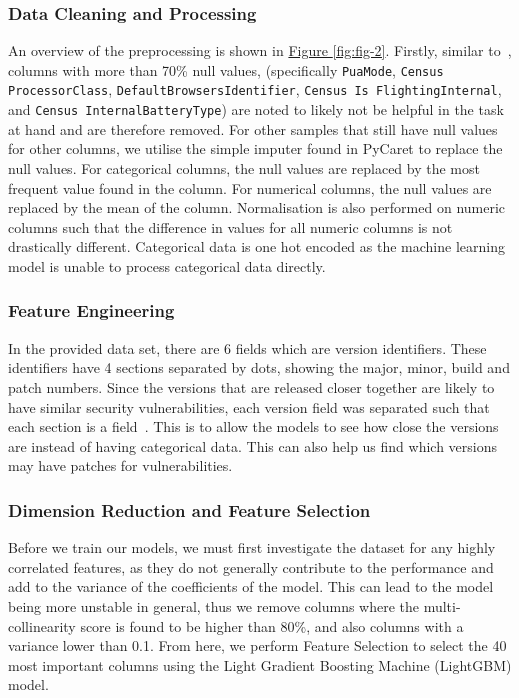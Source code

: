 \documentclass[pdflatex,sn-basic,Numbered]{sn-jnl}%
\theoremstyle{thmstyleone}%
\theoremstyle{thmstyletwo}%
\theoremstyle{thmstylethree}%
\newcommand{\reffig}[1]{\hyperref[#1]{Figure \ref*{#1}}}
\begin{document}
\subsubsection{Data Cleaning and Processing} 
An overview of the preprocessing is shown in \reffig{fig:fig-2}.
Firstly, similar to~\cite{shahini2019}, columns with more than 70\% null values, {(specifically \texttt{PuaMode}, \texttt{Census
ProcessorClass}, \texttt{DefaultBrowsersIdentifier}, \texttt{Census Is FlightingInternal}, and \texttt{Census InternalBatteryType})} are noted to likely not be helpful in the task at hand and are therefore removed.
For other samples that still have null values for other columns, we utilise the simple imputer found in PyCaret to replace the null values.
For categorical columns, the null values are replaced by the most frequent value found in the column.
For numerical columns, the null values are replaced by the mean of the column.
Normalisation is also performed on numeric columns such that the difference in values for all numeric columns is not drastically different.
Categorical data is one hot encoded as the machine learning model is unable to process categorical data directly.

\subsubsection{Feature Engineering} 
In the provided data set, there are 6 fields which are version identifiers.
These identifiers have 4 sections separated by dots, showing the major, minor, build and patch numbers.
Since the versions that are released closer together are likely to have similar security vulnerabilities, each version field was separated such that each section is a field~\cite{iop2020}.
This is to allow the models to see how close the versions are instead of having categorical data.
This can also help us find which versions may have patches for vulnerabilities.

\subsubsection{Dimension Reduction and Feature Selection}
Before we train our models, we must first investigate the dataset for any highly correlated features, as they do not generally contribute to the performance and add to the variance of the coefficients of the model.
This can lead to the model being more unstable in general, thus we remove columns where the multi-collinearity score is found to be higher than 80\%, and also columns with a variance lower than 0.1. From here, we perform Feature Selection to select the 40 most important columns using the Light Gradient Boosting Machine (LightGBM) model.
\end{document}
